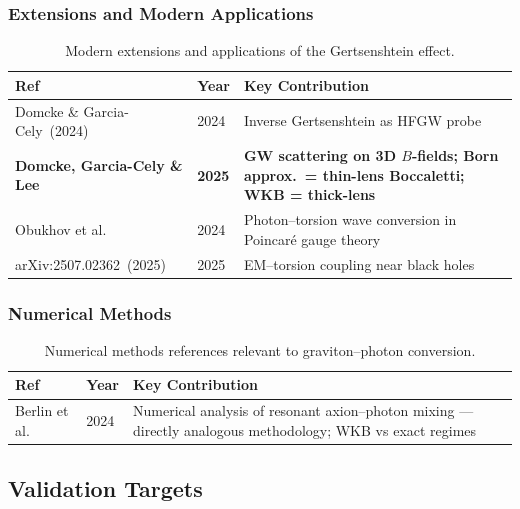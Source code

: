 \subsubsection{Extensions and Modern Applications}
\label{subsec:extensions-refs}

\begin{table}[htbp]
\centering
\caption{Modern extensions and applications of the Gertsenshtein effect.}
\label{tab:gert-extension-refs}
\begin{tabular}{@{}lll@{}}
\toprule
Ref & Year & Key Contribution \\
\midrule
Domcke \& Garcia-Cely~(2024) & 2024 & Inverse Gertsenshtein as HFGW probe \\
\textbf{Domcke, Garcia-Cely \& Lee}~\cite{domcke2025scattering} & \textbf{2025} & \textbf{GW scattering on 3D $B$-fields; Born approx.\ = thin-lens Boccaletti; WKB = thick-lens} \\
Obukhov et al.~\cite{obukhov2024electrodynamics} & 2024 & Photon--torsion wave conversion in Poincar\'e gauge theory \\
arXiv:2507.02362~(2025) & 2025 & EM--torsion coupling near black holes \\
\bottomrule
\end{tabular}
\end{table}

\subsubsection{Numerical Methods}
\label{subsec:numerical-methods-refs}

\begin{table}[htbp]
\centering
\caption{Numerical methods references relevant to graviton--photon conversion.}
\label{tab:gert-numerical-refs}
\begin{tabular}{@{}lll@{}}
\toprule
Ref & Year & Key Contribution \\
\midrule
Berlin et al.~\cite{berlin2024axionphoton} & 2024 & Numerical analysis of resonant axion--photon mixing --- directly analogous methodology; WKB vs exact regimes \\
\bottomrule
\end{tabular}
\end{table}

\subsection{Validation Targets}
\label{subsec:validation-targets}

